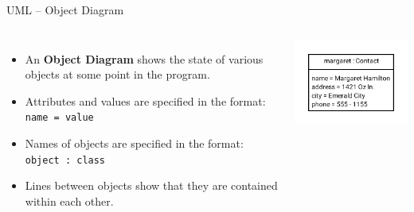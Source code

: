 \documentclass[]{beamer}
\begin{document}
\begin{frame}{UML -- Object Diagram}
    \begin{columns}
    \begin{itemize}[<+->]
        \item An \textbf{Object Diagram} shows the state of various
            objects at some point in the program.
        \item Attributes and values are specified in the format:
            \newline \texttt{name = value}
        \item Names of objects are specified in the format:
            \newline \texttt{object : class}
        \item Lines between objects show that they are contained
            within each other.
    \end{itemize}

    \includegraphics[width=\textwidth]{images/uml-object}
    \end{columns}
\end{frame}
\end{document}
